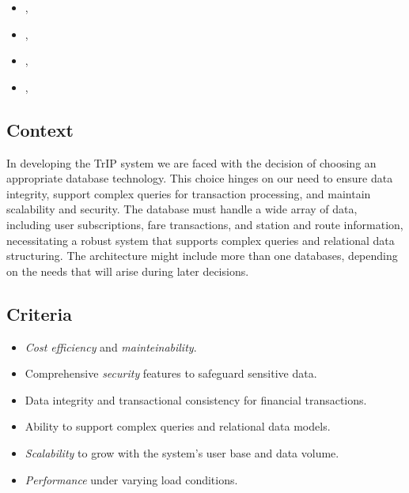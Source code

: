 \begin{itemize}[noitemsep]
    \item \userStoryEighteen,
    \item \userStoryTwentyNine,
    \item \userStoryThirty,
    \item \userStoryThirtyTwo,
\end{itemize}

\subsection*{Context}
In developing the TrIP system we are faced with the decision of choosing an appropriate database technology. This choice hinges on our need to ensure data integrity, support complex queries for transaction processing, and maintain scalability and security.
The database must handle a wide array of data, including user subscriptions, fare transactions, and station and route information, necessitating a robust system that supports complex queries and relational data structuring.
The architecture might include more than one databases, depending on the needs that will arise during later decisions.

\subsection*{Criteria}
\begin{itemize}[noitemsep]
    \item \textit{Cost efficiency} and \textit{mainteinability}.
    \item Comprehensive \textit{security} features to safeguard sensitive data.
    \item Data integrity and transactional consistency for financial transactions.
    \item Ability to support complex queries and relational data models.
    \item \textit{Scalability} to grow with the system's user base and data volume.
    \item \textit{Performance} under varying load conditions.
\end{itemize}

